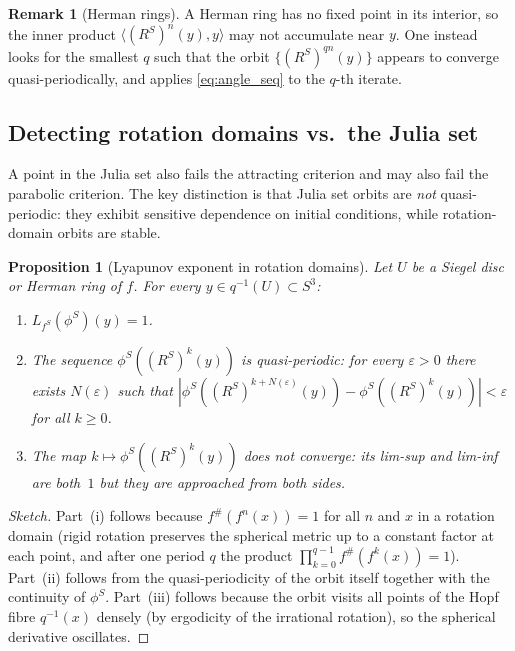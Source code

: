 \documentclass[12pt]{article}
\newtheorem{proposition}[theorem]{Proposition}
\theoremstyle{definition}
\newtheorem{remark}[theorem]{Remark}
\newcommand{\RS}{R^S}
\begin{document}
\begin{remark}[Herman rings]
  A Herman ring has no fixed point in its interior, so the inner product
  $\langle (\RS)^n(y), y\rangle$ may not accumulate near $y$.  One instead
  looks for the smallest $q$ such that the orbit $\{(\RS)^{qn}(y)\}$ appears
  to converge quasi-periodically, and applies \eqref{eq:angle_seq} to
  the $q$-th iterate.
\end{remark}

\subsection{Detecting rotation domains vs.~the Julia set}

A point in the Julia set also fails the attracting criterion and may also
fail the parabolic criterion.  The key distinction is that Julia set
orbits are \emph{not} quasi-periodic: they exhibit sensitive dependence
on initial conditions, while rotation-domain orbits are stable.

\begin{proposition}[Lyapunov exponent in rotation domains]
  \label{prop:siegel}
  Let $U$ be a Siegel disc or Herman ring of $f$.  For every $y \in
  q^{-1}(U) \subset S^3$:
  \begin{enumerate}[label=(\roman*)]
    \item $L_{f^S}(\phi^S)(y) = 1$.
    \item The sequence $\phi^S((\RS)^k(y))$ is quasi-periodic: for every
          $\varepsilon > 0$ there exists $N(\varepsilon)$ such that
          $|\phi^S((\RS)^{k+N(\varepsilon)}(y)) -
          \phi^S((\RS)^k(y))| < \varepsilon$ for all $k\ge 0$.
    \item The map $k \mapsto \phi^S((\RS)^k(y))$ does not converge: its
          lim-sup and lim-inf are both~$1$ but they are approached
          from both sides.
  \end{enumerate}
\end{proposition}

\begin{proof}[Sketch]
  Part~(i) follows because $f^{\#}(f^n(x)) = 1$ for all $n$ and $x$ in a
  rotation domain (rigid rotation preserves the spherical metric up to a
  constant factor at each point, and after one period $q$ the product
  $\prod_{k=0}^{q-1} f^{\#}(f^k(x)) = 1$).  Part~(ii) follows from the
  quasi-periodicity of the orbit itself together with the continuity of
  $\phi^S$.  Part~(iii) follows because the orbit visits all points of the
  Hopf fibre $q^{-1}(x)$ densely (by ergodicity of the irrational
  rotation), so the spherical derivative oscillates.
\end{proof}
\end{document}
